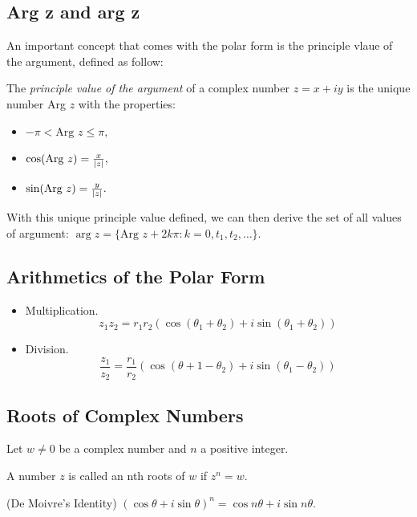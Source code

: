 \documentclass[11pt,reqno,oneside,a4paper]{article}
\begin{document}
\subsection{Arg z and arg z} An important concept that comes with the polar form is the principle vlaue of the argument, defined as follow:
\begin{defn}
	The \textit{principle value of the argument} of a complex number $z = x+iy$ is the unique number Arg $z$ with the properties: 
	
	\begin{itemize}
		\item $-\pi < \text{Arg }z \leq \pi,$
		\item $\cos(\text{Arg }z) = \frac{x}{\left\lvert z\right\rvert},$
		\item $\sin(\text{Arg }z) = \frac{y}{\left\lvert z\right\rvert}.$
	\end{itemize}
	With this unique principle value defined, we can then derive the set of all values of argument: $\arg z = \{\text{Arg }z + 2k\pi: k = 0, t_1, t_2,\dots\}.$
	
\end{defn}

\subsection{Arithmetics of the Polar Form}
\begin{itemize}
	\item Multiplication.
	$$z_1 z_2 = r_1 r_2 (\cos(\theta_1 +\theta_2) + i\sin(\theta_1 +\theta_2))$$
	
	\item Division.
	$$\frac{z_1}{z_2} = \frac{r_1}{r_2} (\cos(\theta+1 - \theta_2) + i\sin(\theta_1-\theta_2))$$
\end{itemize}

\subsection{Roots of Complex Numbers}

\begin{defn}
	Let $w\neq 0$ be a complex number and $n$ a positive integer. 
	
	A number $z$ is called an nth roots of $w$ if $z^n = w$. 
\end{defn}

\begin{prop}
	(De Moivre's Identity) $(\cos \theta +i\sin \theta)^n = \cos n \theta + i\sin n \theta$.
\end{prop}
\end{document}
